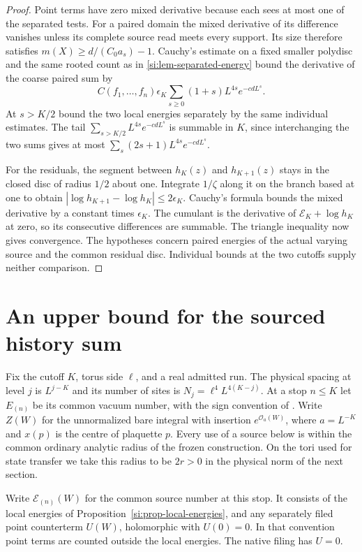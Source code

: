 \documentclass[11pt,letterpaper,reqno]{amsart}
\numberwithin{equation}{section}
\theoremstyle{definition}
\theoremstyle{remark}
\begin{document}
\begin{proof}
Point terms have zero mixed derivative because each sees at
most one of the separated tests. For a paired domain the
mixed derivative of its difference vanishes unless its
complete source read meets every support. Its size therefore
satisfies $m(X)\ge d/(C_0a_s)-1$. Cauchy's estimate on a fixed
smaller polydisc and the same rooted count as in
\cref{si:lem-separated-energy} bound the derivative of the
coarse paired sum by
\[
 C(f_1,\ldots,f_n)\epsilon_K
       \sum_{s\ge0}(1+s)L^{4s}e^{-cdL^s}.
\]
At $s>K/2$ bound the two local energies separately by the same
individual estimates. The tail $\sum_{s>K/2} L^{4s}e^{-cdL^s}$
is summable in $K$, since interchanging the two sums gives at
most $\sum_s(2s+1)L^{4s}e^{-cdL^s}$.

For the residuals, the segment between $h_K(z)$ and $h_{K+1}(z)$
stays in the closed disc of radius $1/2$ about one. Integrate
$1/\zeta$ along it on the branch based at one to obtain
$|\log h_{K+1}-\log h_K|\le2\epsilon_K$. Cauchy's formula bounds
the mixed derivative by a constant times $\epsilon_K$. The
cumulant is the derivative of $\mathcal E_K+\log h_K$ at zero,
so its consecutive differences are summable. The triangle
inequality now gives convergence. The hypotheses concern paired
energies of the actual varying source and the common residual
disc. Individual bounds at the two cutoffs supply neither
comparison.
\end{proof}



\section{An upper bound for the sourced history sum}
\label{si:sec-history-stability}

Fix the cutoff $K$, torus side $\ell$, and a real admitted run.
The physical spacing at level $j$ is $L^{j-K}$ and its number of
sites is $N_j=\ell^4L^{4(K-j)}$. At a stop $n\le K$ let $E_{(n)}$
be its common vacuum number, with the sign convention of
\cite[Equation~(2.iv)]{RT}.
Write $Z(W)$ for the unnormalized bare integral with insertion
$e^{\mathcal O_a(W)}$, where $a=L^{-K}$ and $x(p)$ is the centre of
plaquette $p$. Every use of a source below is within the common
ordinary analytic radius of the frozen construction. On the tori
used for state transfer we take this radius to be $2r>0$ in the
physical norm of the next section.

Write $\mathcal E_{(n)}(W)$ for the common source number at this
stop. It consists of the local energies of
Proposition~\ref{si:prop-local-energies}, and any separately filed
point counterterm $U(W)$, holomorphic with $U(0)=0$. In that convention point terms are
counted outside the local energies. The native filing has $U=0$.
\end{document}
